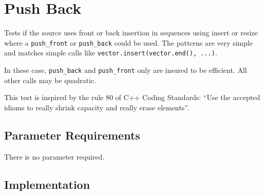 %
%

\section{Push Back}
\label{PushBack::overview}

Tests if the source uses front or back insertion in sequences using
insert or resize where a \texttt{push\_front} or \texttt{push\_back}
could be used. The patterns are very simple and matches simple calls
like \texttt{vector.insert(vector.end(), ...)}.

In these case, \texttt{push\_back} and \texttt{push\_front} only are
insured to be efficient. All other calls may be quadratic.

This test is inspired by the rule 80 of C++ Coding Standards: ``Use the
accepted idioms to really shrink capacity and really erase elements''.

\subsection{Parameter Requirements}

There is no parameter required.

\subsection{Implementation}

